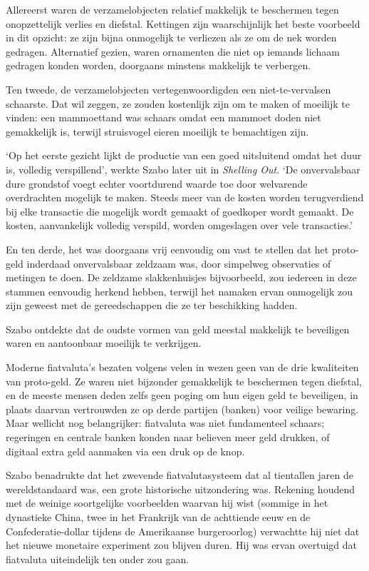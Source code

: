 \documentclass[
  a5paper,
  smalldemyvopaper,11pt,twoside,onecolumn,openright,extrafontsizes,
hidelinks]{memoir}
\begin{document}
Allereerst waren de verzamelobjecten relatief makkelijk te beschermen
tegen onopzettelijk verlies en diefstal. Kettingen zijn waarschijnlijk
het beste voorbeeld in dit opzicht: ze zijn bijna onmogelijk te
verliezen als ze om de nek worden gedragen. Alternatief gezien, waren
ornamenten die niet op iemands lichaam gedragen konden worden, doorgaans
minstens makkelijk te verbergen.

Ten tweede, de verzamelobjecten vertegenwoordigden een niet-te-vervalsen
schaarste. Dat wil zeggen, ze zouden kostenlijk zijn om te maken of
moeilijk te vinden: een mammoettand was schaars omdat een mammoet doden
niet gemakkelijk is, terwijl struisvogel eieren moeilijk te bemachtigen
zijn.

`Op het eerste gezicht lijkt de productie van een goed uitsluitend omdat
het duur is, volledig verspillend', werkte Szabo later uit in
\emph{Shelling Out}. `De onvervalsbaar dure grondstof voegt echter
voortdurend waarde toe door welvarende overdrachten mogelijk te maken.
Steeds meer van de kosten worden terugverdiend bij elke transactie die
mogelijk wordt gemaakt of goedkoper wordt gemaakt. De kosten,
aanvankelijk volledig verspild, worden omgeslagen over vele
transacties.'

En ten derde, het was doorgaans vrij eenvoudig om vast te stellen dat
het proto-geld inderdaad onvervalsbaar zeldzaam was, door simpelweg
observaties of metingen te doen. De zeldzame slakkenhuisjes
bijvoorbeeld, zou iedereen in deze stammen eenvoudig herkend hebben,
terwijl het namaken ervan onmogelijk zou zijn geweest met de
gereedschappen die ze ter beschikking hadden.

Szabo ontdekte dat de oudste vormen van geld meestal makkelijk te
beveiligen waren en aantoonbaar moeilijk te verkrijgen.

Moderne fiatvaluta's bezaten volgens velen in wezen geen van de drie
kwaliteiten van proto-geld. Ze waren niet bijzonder gemakkelijk te
beschermen tegen diefstal, en de meeste mensen deden zelfs geen poging
om hun eigen geld te beveiligen, in plaats daarvan vertrouwden ze op
derde partijen (banken) voor veilige bewaring. Maar wellicht nog
belangrijker: fiatvaluta was niet fundamenteel schaars; regeringen en
centrale banken konden naar believen meer geld drukken, of digitaal
extra geld aanmaken via een druk op de knop.

Szabo benadrukte dat het zwevende fiatvalutasysteem dat al tientallen
jaren de wereldstandaard was, een grote historische uitzondering was.
Rekening houdend met de weinige soortgelijke voorbeelden waarvan hij
wist (sommige in het dynastieke China, twee in het Frankrijk van de
achttiende eeuw en de Confederatie-dollar tijdens de Amerikaanse
burgeroorlog) verwachtte hij niet dat het nieuwe monetaire experiment
zou blijven duren. Hij was ervan overtuigd dat fiatvaluta uiteindelijk
ten onder zou gaan.
\end{document}
